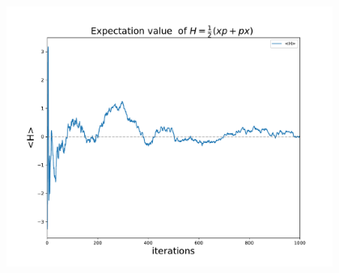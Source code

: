 \documentclass[12pt, letterpaper]{article}
\begin{document}
        \begin{adjustbox}{center,caption={Graph of Expectation value of Berry-Keating},nofloat=figure,label={somelabel}}
            \includegraphics[width=0.8\textwidth]{bk.pdf}
        \end{adjustbox}
\end{document}
